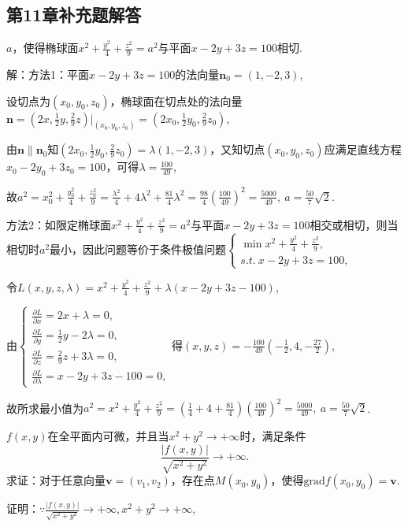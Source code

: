 \documentclass[12pt,UTF8]{ctexart}
\begin{document}
\subsection{第11章补充题解答}
\begin{enumerate}
$a$，使得椭球面$x^2+\frac{y^2}4+\frac{z^2}9=a^2$与平面$x-2y+3z=100$相切.

解：方法1：平面$x-2y+3z=100$的法向量$\bm n_0=(1,-2,3)$,

设切点为$(x_0,y_0,z_0)$，椭球面在切点处的法向量$\bm n=(2x,\frac12y,\frac29z)\big|_{(x_0,y_0,z_0)}=(2x_0,\frac12y_0,\frac29z_0)$,

由$\bm n\parallel\bm n_0$知$(2x_0,\frac12y_0,\frac29z_0)=\lambda(1,-2,3)$，又知切点$(x_0,y_0,z_0)$应满足直线方程$x_0-2y_0+3z_0=100$，可得$\lambda=\frac{100}{49}$,

故$a^2=x_0^2+\frac{y_0^2}4+\frac{z_0^2}9=\frac{\lambda^2}4+4\lambda^2+\frac{81}4\lambda^2=\frac{98}4(\frac{100}{49})^2=\frac{5000}{49},\ a=\frac{50}7\sqrt2$.

方法2：如限定椭球面$x^2+\frac{y^2}4+\frac{z^2}9=a^2$与平面$x-2y+3z=100$相交或相切，则当相切时$a^2$最小，因此问题等价于条件极值问题$\begin{cases}
\min{x^2+\frac{y^2}4+\frac{z^2}9},\\
s.t.\ x-2y+3z=100,
\end{cases}$

令$L(x,y,z,\lambda)=x^2+\frac{y^2}4+\frac{z^2}9+\lambda(x-2y+3z-100)$,

由$\begin{cases}
\frac{\partial L}{\partial x}=2x+\lambda=0,\\
\frac{\partial L}{\partial y}=\frac12y-2\lambda=0,\\
\frac{\partial L}{\partial z}=\frac29z+3\lambda=0,\\
\frac{\partial L}{\partial\lambda}=x-2y+3z-100=0,
\end{cases}$得$(x,y,z)=-\frac{100}{49}(-\frac12,4,-\frac{27}2)$,

故所求最小值为$a^2=x^2+\frac{y^2}4+\frac{z^2}9=(\frac14+4+\frac{81}4)(\frac{100}{49})^2=\frac{5000}{49},\ a=\frac{50}7\sqrt2$.

$f(x,y)$在全平面内可微，并且当$x^2+y^2\rightarrow+\infty$时，满足条件
\[
\frac{|f(x,y)|}{\sqrt{x^2+y^2}}\rightarrow+\infty.
\]
求证：对于任意向量$\bm v=(v_1,v_2)$，存在点$M(x_0,y_0)$，使得$\mathrm{grad}f(x_0,y_0)=\bm v$.

证明：$\because\frac{|f(x,y)|}{\sqrt{x^2+y^2}}\rightarrow+\infty,x^2+y^2\rightarrow+\infty$,


\end{enumerate}
\end{document}
